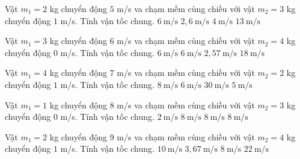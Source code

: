 \begin{ex}
Vật $m_1=2$ kg chuyển động $5$ m/s va chạm mềm cùng chiều với vật $m_2=3$ kg chuyển động $1$ m/s. Tính vận tốc chung.
\choice
{$6\ \mathrm{m/s}$}
{\True $2,6\ \mathrm{m/s}$}
{$4\ \mathrm{m/s}$}
{$13\ \mathrm{m/s}$}
\end{ex}

\begin{ex}
Vật $m_1=3$ kg chuyển động $6$ m/s va chạm mềm cùng chiều với vật $m_2=4$ kg chuyển động $0$ m/s. Tính vận tốc chung.
\choice
{$6\ \mathrm{m/s}$}
{$6\ \mathrm{m/s}$}
{\True $2,57\ \mathrm{m/s}$}
{$18\ \mathrm{m/s}$}
\end{ex}

\begin{ex}
Vật $m_1=4$ kg chuyển động $7$ m/s va chạm mềm cùng chiều với vật $m_2=2$ kg chuyển động $1$ m/s. Tính vận tốc chung.
\choice
{$8\ \mathrm{m/s}$}
{$6\ \mathrm{m/s}$}
{$30\ \mathrm{m/s}$}
{\True $5\ \mathrm{m/s}$}
\end{ex}

\begin{ex}
Vật $m_1=1$ kg chuyển động $8$ m/s va chạm mềm cùng chiều với vật $m_2=3$ kg chuyển động $0$ m/s. Tính vận tốc chung.
\choice
{\True $2\ \mathrm{m/s}$}
{$8\ \mathrm{m/s}$}
{$8\ \mathrm{m/s}$}
{$8\ \mathrm{m/s}$}
\end{ex}

\begin{ex}
Vật $m_1=2$ kg chuyển động $9$ m/s va chạm mềm cùng chiều với vật $m_2=4$ kg chuyển động $1$ m/s. Tính vận tốc chung.
\choice
{$10\ \mathrm{m/s}$}
{\True $3,67\ \mathrm{m/s}$}
{$8\ \mathrm{m/s}$}
{$22\ \mathrm{m/s}$}
\end{ex}

